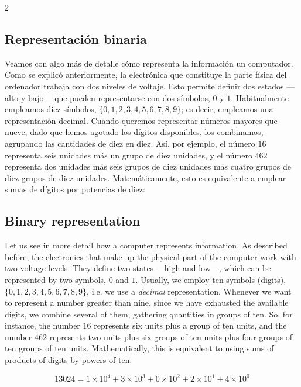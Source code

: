 \begin{paracol}{2}
\subsection{Representación binaria} 
Veamos con algo más de detalle cómo representa la información un computador. Como se explicó anteriormente, la electrónica que constituye la parte física del ordenador trabaja con dos niveles de voltaje. Esto permite definir dos estados ---alto y bajo--- que pueden representarse con dos símbolos, $0$ y $1$. Habitualmente empleamos diez símbolos, $\{0,1,2,3,4,5,6,7,8,9\}$; es decir, empleamos una representación decimal. Cuando queremos representar números mayores que nueve, dado que hemos agotado los dígitos disponibles, los combinamos, agrupando las cantidades de diez en diez. Así, por ejemplo, el número $16$ representa seis unidades más un grupo de diez unidades, y el número $462$ representa dos unidades más seis grupos de diez unidades más cuatro grupos de diez grupos de diez unidades. Matemáticamente, esto es equivalente a emplear sumas de dígitos por potencias de diez:
\switchcolumn
\subsection{Binary representation} 

Let us see in more detail how a computer represents information. As described before, the electronics that make up the physical part of the computer work with two voltage levels. They define two states ---high and low---, which can be represented by two symbols, $0$ and $1$. Usually, we employ ten symbols (digits), $\{0,1,2,3,4,5,6,7,8,9\}$, i.e. we use a \emph{decimal} representation. Whenever we want to represent a number greater than nine, since we have exhausted the available digits, we combine several of them, gathering quantities in groups of ten. So, for instance, the number $16$ represents six units plus a group of ten units, and the number $462$ represents two units plus six groups of ten units plus four groups of ten groups of ten units. Mathematically, this is equivalent to using sums of products of digits by powers of ten:

\end{paracol}
\begin{equation*}
13024 = 1\times10^4+3\times10^3+0\times10^2+2\times10^1+4\times10^0
\end{equation*}


